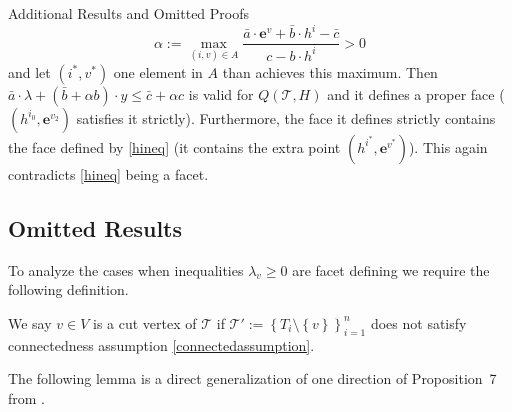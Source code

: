 \documentclass[mnsc]{informs3}
\newcommand{\set}[1]{\left\{#1\right\}}                     %
\newcommand{\bra}[1]{\left(#1\right)}
\newcommand{\e}{\mathbf{e}}
\begin{document}
\begin{APPENDIX}{Additional Results and Omitted Proofs}
\[\alpha :=\max_{\bra{i,v}\in A} \frac{\bar{a} \cdot\e^{v} +\bar{b}\cdot h^{i} -\bar{c}}{c- b\cdot h^i}>0\]
and let $\bra{i^*,v^*}$ one element in $A$ than achieves this maximum. Then $\bar{a} \cdot\lambda+ \bra{\bar{b}+\alpha b}\cdot y  \leq\bar{c}+\alpha c$ is valid for  $Q\bra{\mathcal{T},H}$ and  it defines a proper face ($\bra{h^{i_0},\e^{v_2}}$ satisfies it strictly). Furthermore, the face it defines strictly contains the face defined by \eqref{hineq} (it contains the extra point $\bra{h^{i^*},\e^{v^*}}$). This again contradicts \eqref{hineq} being a facet.
\Halmos\endproof

\subsection{Omitted Results}\label{appendixresconnectedsection}


To analyze the cases when inequalities $\lambda_v\geq 0$ are facet defining we require the following definition. 

\begin{definition} We say $v\in V$ is a cut vertex of $\mathcal{T}$ if $\mathcal{T}':=\set{T_i\setminus \set{v}}_{i=1}^n$ does not satisfy connectedness assumption \ref{connectedassumption}.
\end{definition}

The following lemma is a direct generalization of one direction of Proposition~7 from \cite{lee01}. 


\end{APPENDIX}
\end{document}
